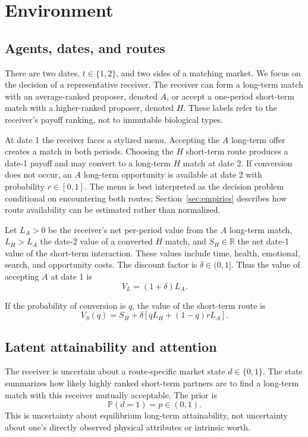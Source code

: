 \documentclass[11pt]{article}
\newcommand{\Prob}{\mathbb{P}}
\begin{document}
\section{Environment}

\subsection{Agents, dates, and routes}

There are two dates, $t\in\{1,2\}$, and two sides of a matching market. We
focus on the decision of a representative receiver. The receiver can form a
long-term match with an average-ranked proposer, denoted $A$, or accept a
one-period short-term match with a higher-ranked proposer, denoted $H$. These
labels refer to the receiver's payoff ranking, not to immutable biological
types.

At date 1 the receiver faces a stylized menu. Accepting the $A$ long-term offer
creates a match in both periods. Choosing the $H$ short-term route produces a
date-1 payoff and may convert to a long-term $H$ match at date 2. If conversion
does not occur, an $A$ long-term opportunity is available at date 2 with
probability $r\in[0,1]$. The menu is best interpreted as the decision problem
conditional on encountering both routes; Section~\ref{sec:empirics} describes
how route availability can be estimated rather than normalized.

Let $L_A>0$ be the receiver's net per-period value from the $A$ long-term match,
$L_H>L_A$ the date-2 value of a converted $H$ match, and $S_H\in\mathbb{R}$ the
net date-1 value of the short-term interaction. These values include time,
health, emotional, search, and opportunity costs. The discount factor is
$\delta\in(0,1]$. Thus the value of accepting $A$ at date 1 is
\begin{equation}
V_L=(1+\delta)L_A. \label{eq:VL}
\end{equation}

If the probability of conversion is $q$, the value of the short-term route is
\begin{equation}
V_S(q)=S_H+\delta\left[qL_H+(1-q)rL_A\right]. \label{eq:VS}
\end{equation}

\subsection{Latent attainability and attention}

The receiver is uncertain about a route-specific market state
$d\in\{0,1\}$. The state summarizes how likely highly ranked short-term
partners are to find a long-term match with this receiver mutually acceptable.
The prior is
\[
\Prob(d=1)=p\in(0,1).
\]
This is uncertainty about equilibrium long-term attainability, not uncertainty
about one's directly observed physical attributes or intrinsic worth.
\end{document}
